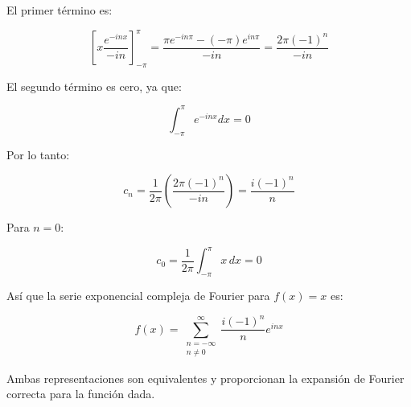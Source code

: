 El primer término es:

\[
\left[ x \frac{e^{-i n x}}{-i n} \right]_{-\pi}^{\pi} = \frac{\pi e^{-i n \pi} - (-\pi) e^{i n \pi}}{-i n} = \frac{2 \pi (-1)^n}{-i n}
\]

El segundo término es cero, ya que:

\[
\int_{-\pi}^{\pi} e^{-i n x} dx = 0
\]

Por lo tanto:

\[
c_n = \frac{1}{2\pi} \left( \frac{2 \pi (-1)^n}{-i n} \right) = \frac{i (-1)^n}{n}
\]

Para \( n = 0 \):

\[
c_0 = \frac{1}{2\pi} \int_{-\pi}^{\pi} x \, dx = 0
\]

Así que la serie exponencial compleja de Fourier para \( f(x) = x \) es:

\[
f(x) = \sum_{\substack{n=-\infty \\ n \neq 0}}^{\infty} \frac{i (-1)^n}{n} e^{i n x}
\]


Ambas representaciones son equivalentes y proporcionan la expansión de Fourier correcta para la función dada.



